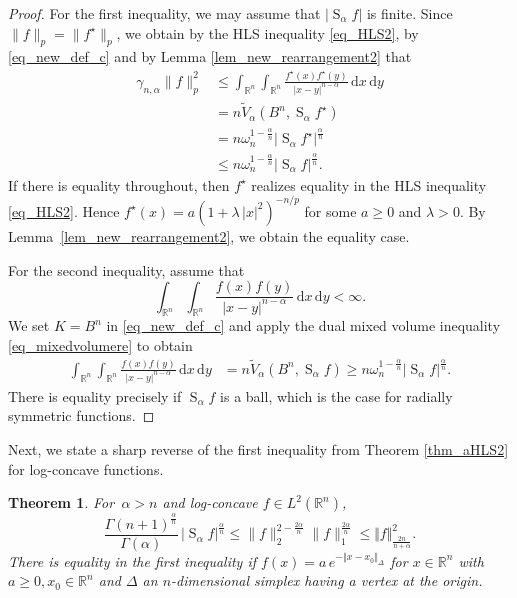 \documentclass{amsart}
\newtheorem{theorem}{Theorem}
\newcommand{\R}{\mathbb R}
\newcommand{\B}{{B^n}}
\renewcommand{\d}{\,\mathrm{d}}
\newcommand{\vol}[1]{\vert #1\vert}
\newcommand{\hls}[1]{\operatorname{S}_{#1}\!} %
\begin{document}
\begin{proof}
For the first inequality, we may assume that $\vol{\hls \alpha f}$ is finite. Since $\|f\|_p=\|f^\star\|_p$, we obtain by the HLS inequality \eqref{eq_HLS2}, by \eqref{eq_new_def_c} and by Lemma \ref{lem_new_rearrangement2} that
\begin{align}
	\gamma_{n,\alpha} \|f\|_p^2 
	&\leq \int_{\R^n}\int_{\R^n} \frac{f^\star(x)f^\star(y)}{|x-y|^{n-\alpha}} \d x \d y \\
	&= n \tilde V_\alpha (\B, \hls \alpha f^\star)\\
	&= n \omega_n^{{1-\frac \alpha n}} \vol{\hls\alpha f^\star}^{\frac\alpha n}\\
	&\leq n \omega_n^{{1-\frac \alpha n}} \vol{\hls\alpha f}^{\frac\alpha n}.
\end{align}
If there is equality throughout, then $f^\star$ realizes equality in the HLS inequality \eqref{eq_HLS2}. Hence $f^\star(x) = a (1 + \lambda\, | x|^2)^{-n/p}$ for some $a\ge0$ and $\lambda>0$.
By Lemma~\ref{lem_new_rearrangement2}, we obtain the equality case.

\goodbreak
For the second inequality, assume that
\[\int_{\R^n}\int_{\R^n} \frac{f(x)f(y)}{\vert x-y\vert^{n-\alpha}}\d x\d y<\infty.\]
We set $K=\B$ in \eqref{eq_new_def_c} and apply the dual mixed volume inequality \eqref{eq_mixedvolumere} to obtain
\begin{align}
    \int_{\R^n}\int_{\R^n} \frac{f(x)f(y)}{\vert x-y\vert^{n-\alpha}}\d x\d y
    &= n \tilde V_{\alpha}(\B, \hls \alpha f)
    \geq n \omega_n^{1-\frac{\alpha} n} \vol{\hls \alpha f}^{\frac\alpha n}.
\end{align}
There is equality precisely if $\hls \alpha f$ is a ball, which is the case for radially symmetric functions.
\end{proof}

Next, we state a sharp reverse of the first inequality from Theorem \ref{thm_aHLS2} for log-concave functions.

\begin{theorem}\label{thm_reverseineq2}
For $\,\alpha>n$ and  log-concave $f\in L^2(\R^n)$, 
\[ \frac{\Gamma(n+1)^\frac{\alpha}n}{\Gamma(\alpha)}\,\vol{\hls\alpha f}^\frac{\alpha}n \leq  \|f\|_2^{2-\frac{2\alpha}n} \|f\|_1^{\frac{2\alpha}n} \leq \Vert f\Vert_{\frac{2n}{n+\alpha}}^2.\]
There is equality in the first inequality if $f(x)=a\,e^{-\Vert x - x_0 \Vert_\Delta}$ for $x\in\R^n$ with $a\ge 0, x_0 \in \R^n$ and $\Delta$ an $n$-dimensional simplex having a vertex at the origin.
\end{theorem}
\end{document}
